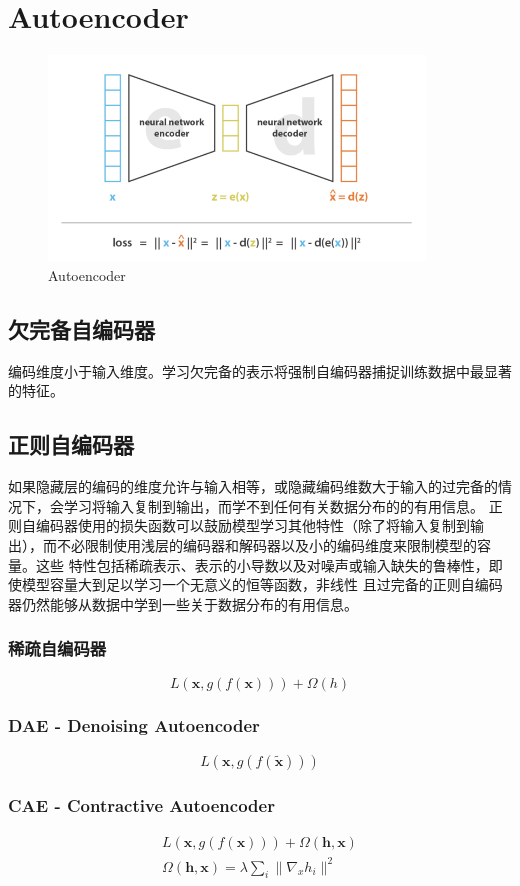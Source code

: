 \chapter{Autoencoder}

\begin{figure}[H]
    \centering
    \includegraphics[width=10cm]{images/ae.png}
    \caption{Autoencoder}
    \label{fig:autoencoder}
\end{figure}

\section{欠完备自编码器}
编码维度小于输入维度。学习欠完备的表示将强制自编码器捕捉训练数据中最显著的特征。

\section{正则自编码器}
如果隐藏层的编码的维度允许与输入相等，或隐藏编码维数大于输入的过完备的情况下，会学习将输入复制到输出，而学不到任何有关数据分布的的有用信息。
正则自编码器使用的损失函数可以鼓励模型学习其他特性（除了将输入复制到输出），而不必限制使用浅层的编码器和解码器以及小的编码维度来限制模型的容量。这些
特性包括稀疏表示、表示的小导数以及对噪声或输入缺失的鲁棒性，即使模型容量大到足以学习一个无意义的恒等函数，非线性
且过完备的正则自编码器仍然能够从数据中学到一些关于数据分布的有用信息。

\subsection{稀疏自编码器}
\begin{equation}
    L(\mathbf{x}, g(f(\mathbf{x}))) + \Omega (h)
\end{equation}
\subsection{DAE - Denoising Autoencoder}
\begin{equation}
    L(\mathbf{x}, g(f(\tilde{\mathbf{x}})))
\end{equation}
\subsection{CAE - Contractive Autoencoder}
\begin{equation}
    \begin{split}
        L(\mathbf{x}, g(f(\mathbf{x}))) + \Omega(\mathbf{h}, \mathbf{x}) \\
        \Omega(\mathbf{h}, \mathbf{x}) = \lambda \sum_i \| \nabla_x h_i \|^2
    \end{split}
\end{equation}

